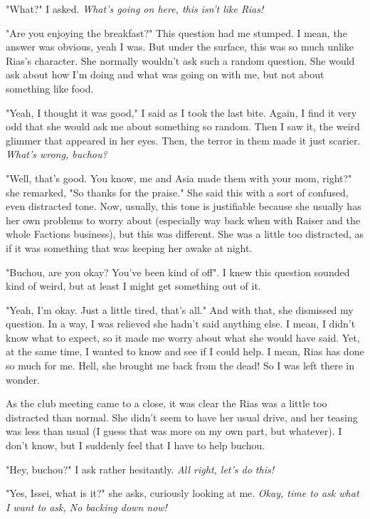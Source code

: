 \documentclass{article}
\begin{document}
"What?" I asked. \emph{What's going on here, this isn't like Rias!}

"Are you enjoying the breakfast?" This question had me stumped. I mean, the answer was obvious, yeah I was. But under the surface, this was so much unlike Rias's character. She normally wouldn't ask such a random question. She would ask about how I'm doing and what was going on with me, but not about something like food.

"Yeah, I thought it was good," I said as I took the last bite. Again, I find it very odd that she would ask me about something so random. Then I saw it, the weird glimmer that appeared in her eyes. Then, the terror in them made it just scarier. \emph{What's wrong, buchou?}

"Well, that's good. You know, me and Asia made them with your mom, right?" she remarked, "So thanks for the praise." She said this with a sort of confused, even distracted tone. Now, usually, this tone is justifiable because she usually has her own problems to worry about (especially way back when with Raiser and the whole Factions business), but this was different. She was a little too distracted, as if it was something that was keeping her awake at night.

"Buchou, are you okay? You've been kind of off". I knew this question sounded kind of weird, but at least I might get something out of it.

"Yeah, I'm okay. Just a little tired, that's all." And with that, she dismissed my question. In a way, I was relieved she hadn't said anything else. I mean, I didn't know what to expect, so it made me worry about what she would have said. Yet, at the same time, I wanted to know and see if I could help. I mean, Rias has done so much for me. Hell, she brought me back from the dead! So I was left there in wonder.

\noindent\makebox[\linewidth]{\rule{\textwidth}{0.4pt}}

As the club meeting came to a close, it was clear the Rias was a little too distracted than normal. She didn't seem to have her usual drive, and her teasing was less than usual (I guess that was more on my own part, but whatever). I don't know, but I suddenly feel that I have to help buchou.

"Hey, buchou?" I ask rather hesitantly. \emph{All right, let's do this!}

"Yes, Issei, what is it?" she asks, curiously looking at me. \emph{Okay, time to ask what I want to ask, No backing down now!}
\end{document}
